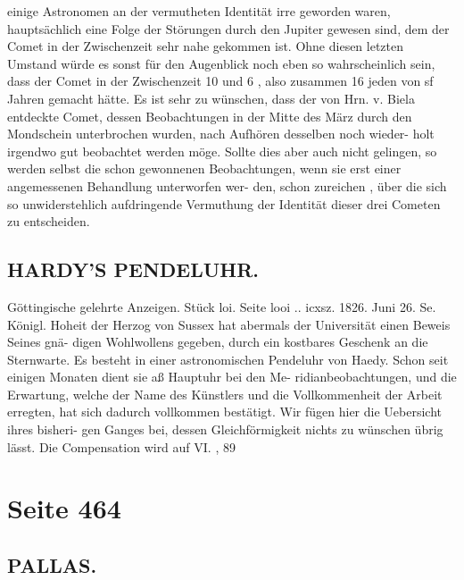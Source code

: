 \documentclass[10pt,a4paper]{article}
\begin{document}
einige  Astronomen  an  der  vermutheten  Identität  irre  geworden  waren,  hauptsächlich  eine  Folge  der
Störungen  durch  den  Jupiter  gewesen  sind,  dem  der  Comet  in  der  Zwischenzeit  sehr  nahe  gekommen
ist.  Ohne  diesen  letzten  Umstand  würde  es  sonst  für  den  Augenblick  noch  eben  so  wahrscheinlich  sein,
dass  der  Comet  in  der  Zwischenzeit  10  und  6 ,  also  zusammen  16  jeden  von  sf  Jahren  gemacht  hätte.
Es  ist  sehr  zu  wünschen,  dass  der  von  Hrn.  v.  Biela  entdeckte  Comet,  dessen  Beobachtungen  in
der  Mitte  des  März  durch  den  Mondschein  unterbrochen  wurden,  nach  Aufhören  desselben  noch  wieder-
holt irgendwo  gut  beobachtet  werden  möge.  Sollte  dies  aber  auch  nicht  gelingen,  so  werden  selbst
die  schon  gewonnenen  Beobachtungen,  wenn  sie  erst  einer  angemessenen  Behandlung  unterworfen  wer-
den, schon  zureichen ,  über  die  sich  so  unwiderstehlich  aufdringende  Vermuthung  der  Identität  dieser
drei  Cometen  zu  entscheiden.
\subsection*{HARDY'S  PENDELUHR.}

Göttingische  gelehrte  Anzeigen.     Stück  loi.     Seite  looi ..  icxsz.     1826.  Juni  26.
Se.  Königl.  Hoheit  der  Herzog  von  Sussex  hat  abermals  der  Universität  einen  Beweis  Seines  gnä-
digen Wohlwollens  gegeben,  durch  ein  kostbares  Geschenk  an  die  Sternwarte.  Es  besteht  in  einer
astronomischen  Pendeluhr  von  Haedy.  Schon  seit  einigen  Monaten  dient  sie  aß  Hauptuhr  bei  den  Me-
ridianbeobachtungen,  und  die  Erwartung,  welche  der  Name  des  Künstlers  und  die  Vollkommenheit  der
Arbeit  erregten,  hat  sich  dadurch  vollkommen  bestätigt.  Wir  fügen  hier  die  Uebersicht  ihres  bisheri-
gen Ganges  bei,  dessen  Gleichförmigkeit  nichts  zu  wünschen  übrig  lässt.     Die    Compensation  wird  auf
VI.  ,  89

\newpage
\section*{Seite 464}

\subsection*{PALLAS.}
\end{document}
